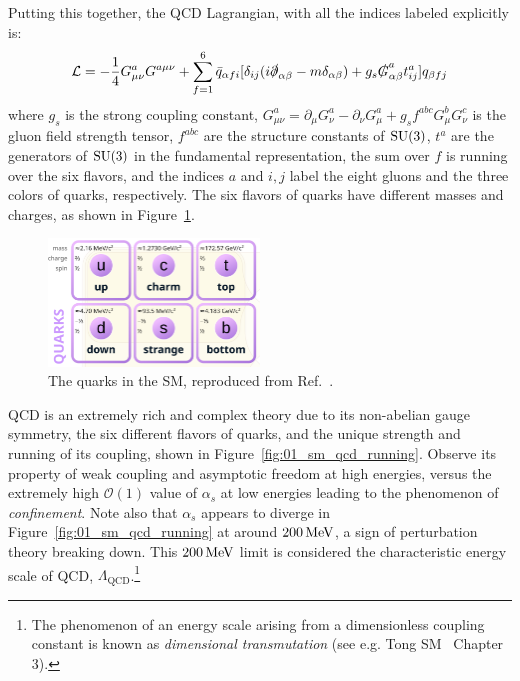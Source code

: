 Putting this together, the QCD Lagrangian, with all the indices labeled explicitly is:
\begin{equation}
	\label{eq:01_sm_qcd_lagrangian}
	\mathcal L = -\frac{1}{4} G^a_{\mu\nu} G^{a\mu\nu} + \sum_{f = 1}^6 \bar q_{\alpha f i} [\delta_{ij}(i\slashed \partial_{\alpha\beta} - m \delta_{\alpha\beta}) + g_s \slashed G^a_{\alpha\beta} t_{ij}^a] q_{\beta f j}
\end{equation}
where $g_s$ is the strong coupling constant, $G^a_{\mu\nu} = \partial_\mu G^a_\nu - \partial_\nu G^a_\mu + g_s f^{abc} G^b_\mu G^c_\nu$ is the gluon field strength tensor, $f^{abc}$ are the structure constants of $\SU[3]$, $t^a$ are the generators of $\SU[3]$ in the fundamental representation, the sum over $f$ is running over the six flavors, and the indices $a$ and $i, j$ label the eight gluons and the three colors of quarks, respectively.
The six flavors of quarks have different masses and charges, as shown in Figure~\ref{fig:01_sm_qcd_quarks}.

\begin{figure}[ht]
	\centering
	\captionsetup{justification=centering}
	\includegraphics[width=0.5\textwidth]{figures/01-SM-03-SM/qcd/quarks.png}
	\caption{The quarks in the SM, reproduced from Ref.~\cite{enwiki:1238968997}.}
	\label{fig:01_sm_qcd_quarks}
\end{figure}

QCD is an extremely rich and complex theory due to its non-abelian gauge symmetry, the six different flavors of quarks, and the unique strength and running of its coupling, shown in Figure~\ref{fig:01_sm_qcd_running}.
Observe its property of weak coupling and asymptotic freedom at high energies, versus the extremely high $\mathcal O(1)$ value of $\alpha_s$ at low energies leading to the phenomenon of \textit{confinement}.
Note also that $\alpha_s$ appears to diverge in Figure~\ref{fig:01_sm_qcd_running} at around $200 \,\text{Me\hspace{-.08em}V}$, a sign of perturbation theory breaking down. 
This $200 \,\text{Me\hspace{-.08em}V}$ limit is considered the characteristic energy scale of QCD, $\Lambda_\mathrm{QCD}$.\footnote{The phenomenon of an energy scale arising from a dimensionless coupling constant  is known as \textit{dimensional transmutation} (see e.g. Tong SM~\cite{TongSM} Chapter 3).}

